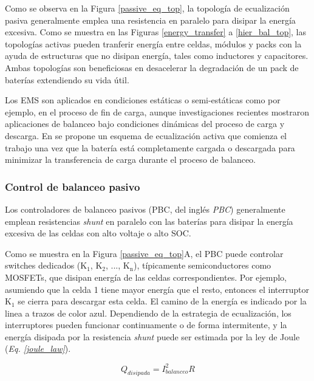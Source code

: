 \documentclass[10pt,a4paper]{article}
\begin{document}
Como se observa en la Figura \ref{passive_eq_top}, la topolog\'ia de
ecualizaci\'on pasiva generalmente emplea una resistencia en paralelo para
disipar la energ\'ia excesiva. Como se muestra en las Figuras
\ref{energy_transfer} a \ref{hier_bal_top}, las topolog\'ias activas pueden
tranferir energ\'ia entre celdas, m\'odulos y packs con la ayuda de estructuras
que no disipan energ\'ia, tales como inductores y capacitores. Ambas
topolog\'ias son beneficiosas en desacelerar la degradaci\'on de un pack de
bater\'ias extendiendo su vida \'util.

Los \acrshort{EMS} son aplicados en condiciones est\'aticas o semi-est\'aticas 
como por ejemplo, en el proceso de fin de carga, aunque investigaciones 
recientes mostraron aplicaciones de balanceo bajo condiciones din\'amicas del 
proceso de carga y descarga. En \cite{shen_cell_bal} se propone un esquema de 
ecualizaci\'on activa que comienza el trabajo una vez que la bater\'ia est\'a
completamente cargada o descargada para minimizar la transferencia de carga 
durante el proceso de balanceo.

\subsubsection{Control de balanceo pasivo}

Los controladores de balanceo pasivos (\acrshort{PBC}, del ingl\'es
\emph{\acrlong{PBC}}) generalmente emplean resistencias \emph{shunt} en paralelo
con las bater\'ias para disipar la energ\'ia excesiva de las celdas con alto
voltaje o alto \acrshort{SOC}.

Como se muestra en la Figura \ref{passive_eq_top}A, el \acrshort{PBC} puede
controlar switches dedicados ($\mathrm{K_1}$, $\mathrm{K_2}$, ...,
$\mathrm{K_n}$), t\'ipicamente semiconductores como MOSFETs, que disipan
energ\'ia de las celdas correspondientes. Por ejemplo, asumiendo que la celda 1
tiene mayor energ\'ia que el resto, entonces el interruptor $\mathrm{K_1}$ se 
cierra para descargar esta celda. El camino de la energ\'ia es indicado por la 
linea a trazos de color azul. Dependiendo de la estrategia de ecualizaci\'on, 
los interruptores pueden funcionar continuamente o de forma intermitente, y la
energ\'ia disipada por la resistencia \emph{shunt} puede ser estimada por la
ley de Joule (\emph{Eq. \ref{joule_law}}).

\begin{equation}
    Q_{disipada} = I^2_{balanceo}R \label{joule_law}
\end{equation}
\end{document}
